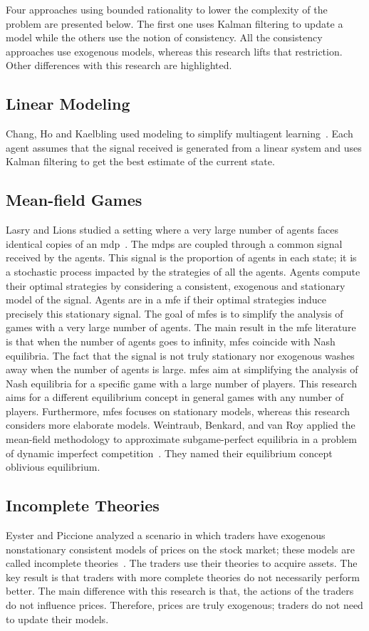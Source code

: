 Four approaches using bounded rationality to lower the complexity of the problem are presented below.
The first one uses Kalman filtering to update a model while the others use the notion of consistency.
All the consistency approaches use exogenous models, whereas this research lifts that restriction.
Other differences with this research are highlighted.

\subsection{Linear Modeling}
Chang, Ho and Kaelbling used modeling to simplify multiagent learning~\cite{chang_ho_kaelbling:2004}.
Each agent assumes that the signal received is generated from a linear system and uses Kalman filtering to get the best estimate of the current state.

\subsection{Mean-field Games}
Lasry and Lions studied a setting where a very large number of agents faces identical copies of an \ac{mdp}~\cite{lasry_lions:2007}.
The \acp{mdp} are coupled through a common signal received by the agents.
This signal is the proportion of agents in each state; it is a stochastic process impacted by the strategies of all the agents.
Agents compute their optimal strategies by considering a consistent, exogenous and stationary model of the signal.
Agents are in a \ac{mfe} if their optimal strategies induce precisely this stationary signal.
The goal of \acp{mfe} is to simplify the analysis of games with a very large number of agents.
The main result in the \ac{mfe} literature is that when the number of agents goes to infinity, \acp{mfe} coincide with Nash equilibria.
The fact that the signal is not truly stationary nor exogenous washes away when the number of agents is large.
\acp{mfe} aim at simplifying the analysis of Nash equilibria for a specific game with a large number of players.
This research aims for a different equilibrium concept in general games with any number of players.
Furthermore, \acp{mfe} focuses on stationary models, whereas this research considers more elaborate models.
Weintraub, Benkard, and van Roy applied the mean-field methodology to approximate subgame-perfect equilibria in a problem of dynamic imperfect competition~\cite{weintraub_benkard_van-roy:2008}.
They named their equilibrium concept oblivious equilibrium.

\subsection{Incomplete Theories}
Eyster and Piccione analyzed a scenario in which traders have exogenous nonstationary consistent models of prices on the stock market; these models are called incomplete theories~\cite{eyster_piccione:2011}.
The traders use their theories to acquire assets.
The key result is that traders with more complete theories do not necessarily perform better.
The main difference with this research is that, the actions of the traders do not influence prices.
Therefore, prices are truly exogenous; traders do not need to update their models.

